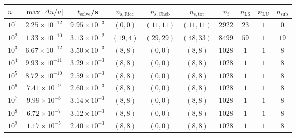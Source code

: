 \begin{tabular}{l c c c c c c c c c}
\hline \hline 
$n$  &  $\max|\Delta u/u|$  &  $t_{\mathrm{solve}}$/\si{\s}  &  $n_{\mathrm{s,Ricc}}$  &  $n_{\mathrm{s,Cheb}}$  &  $n_{\mathrm{s,tot}}$  &  $n_{\mathrm{f}}$  &  $n_{\mathrm{LS}}$  &  $n_{\mathrm{LU}}$  &  $n_{\mathrm{sub}}$ \\ \hline
    $10^1$  &  $2.25 \times 10^{-12}$  &  $9.95\times 10^{-3}$    &  $(0, 0)$  &  $(11, 11)$  &  $(11, 11)$  &  $2922$  &  $23$  &  $1$  &  $0$\\ 
    $10^2$  &  $1.33 \times 10^{-10}$  &  $3.13\times 10^{-2}$    &  $(19, 4)$  &  $(29, 29)$  &  $(48, 33)$  &  $8499$  &  $59$  &  $1$  &  $19$\\ 
    $10^3$  &  $6.67 \times 10^{-12}$  &  $3.50\times 10^{-3}$    &  $(8, 8)$  &  $(0, 0)$  &  $(8, 8)$  &  $1028$  &  $1$  &  $1$  &  $8$\\ 
    $10^4$  &  $9.93 \times 10^{-11}$  &  $3.29\times 10^{-3}$    &  $(8, 8)$  &  $(0, 0)$  &  $(8, 8)$  &  $1028$  &  $1$  &  $1$  &  $8$\\ 
    $10^5$  &  $8.72 \times 10^{-10}$  &  $2.59\times 10^{-3}$    &  $(8, 8)$  &  $(0, 0)$  &  $(8, 8)$  &  $1028$  &  $1$  &  $1$  &  $8$\\ 
    $10^6$  &  $7.41 \times 10^{-9}$  &  $2.60\times 10^{-3}$    &  $(8, 8)$  &  $(0, 0)$  &  $(8, 8)$  &  $1028$  &  $1$  &  $1$  &  $8$\\ 
    $10^7$  &  $9.99 \times 10^{-8}$  &  $3.14\times 10^{-3}$    &  $(8, 8)$  &  $(0, 0)$  &  $(8, 8)$  &  $1028$  &  $1$  &  $1$  &  $8$\\ 
    $10^8$  &  $6.72 \times 10^{-7}$  &  $3.12\times 10^{-3}$    &  $(8, 8)$  &  $(0, 0)$  &  $(8, 8)$  &  $1028$  &  $1$  &  $1$  &  $8$\\ 
    $10^9$  &  $1.17 \times 10^{-5}$  &  $2.40\times 10^{-3}$    &  $(8, 8)$  &  $(0, 0)$  &  $(8, 8)$  &  $1028$  &  $1$  &  $1$  &  $8$\\ 
\hline \hline
\end{tabular}
